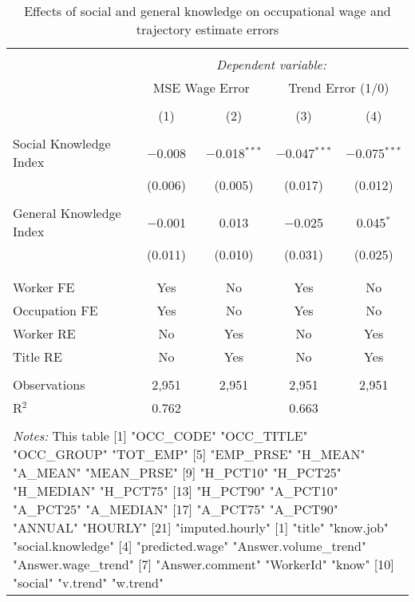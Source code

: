 
\begin{table}[!htbp] \centering 
  \caption{Effects of social and general knowledge on occupational wage and trajectory estimate errors} 
  \label{tab:fe_errors} 
\begin{tabular}{@{\extracolsep{5pt}}lcccc} 
\\[-1.8ex]\hline 
\hline \\[-1.8ex] 
 & \multicolumn{4}{c}{\textit{Dependent variable:}} \\ 
\cline{2-5} 
 & \multicolumn{2}{c}{MSE Wage Error} & \multicolumn{2}{c}{Trend Error (1/0)} \\ 
\\[-1.8ex] & (1) & (2) & (3) & (4)\\ 
\hline \\[-1.8ex] 
 Social Knowledge Index & $-$0.008 & $-$0.018$^{***}$ & $-$0.047$^{***}$ & $-$0.075$^{***}$ \\ 
  & (0.006) & (0.005) & (0.017) & (0.012) \\ 
  & & & & \\ 
 General Knowledge Index & $-$0.001 & 0.013 & $-$0.025 & 0.045$^{*}$ \\ 
  & (0.011) & (0.010) & (0.031) & (0.025) \\ 
  & & & & \\ 
\hline \\[-1.8ex] 
Worker FE & Yes & No & Yes & No \\ 
Occupation FE & Yes & No & Yes & No \\ 
Worker RE & No & Yes & No & Yes \\ 
Title RE & No & Yes & No & Yes \\ 
\hline \\[-1.8ex] 
Observations & 2,951 & 2,951 & 2,951 & 2,951 \\ 
R$^{2}$ & 0.762 &  & 0.663 &  \\ 
\hline 
\hline \\[-1.8ex] 
\multicolumn{5}{p{0.80 \linewidth}}{
\emph{Notes:} This table [1] "OCC_CODE"       "OCC_TITLE"      "OCC_GROUP"      "TOT_EMP"       
 [5] "EMP_PRSE"       "H_MEAN"         "A_MEAN"         "MEAN_PRSE"     
 [9] "H_PCT10"        "H_PCT25"        "H_MEDIAN"       "H_PCT75"       
[13] "H_PCT90"        "A_PCT10"        "A_PCT25"        "A_MEDIAN"      
[17] "A_PCT75"        "A_PCT90"        "ANNUAL"         "HOURLY"        
[21] "imputed.hourly"
 [1] "title"               "know.job"            "social.knowledge"   
 [4] "predicted.wage"      "Answer.volume_trend" "Answer.wage_trend"  
 [7] "Answer.comment"      "WorkerId"            "know"               
[10] "social"              "v.trend"             "w.trend"            

}
\end{tabular}
\end{table}
